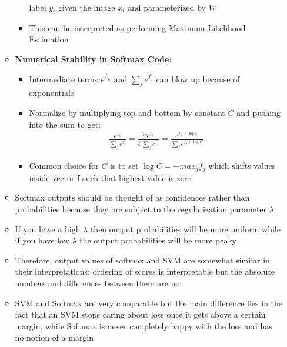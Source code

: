 \documentclass[12pt]{article}
\begin{document}
\begin{itemize}
\begin{itemize}
\begin{itemize}
        label $y_i$ given the image $x_i$ and parameterized by $W$
        \item This can be interpreted as performing Maximum-Likelihood Estimation
      \end{itemize}
      \item \textbf{Numerical Stability in Softmax Code}:
      \begin{itemize}
        \item Intermediate terms $e^{f_{y_i}}$ and $\sum_j e^{f_j}$ can blow up because of exponentials
        \item Normalize by multiplying top and bottom by constant $C$ and pushing into the sum to get:
        \begin{gather*}
          \frac{e^{f_{y_i}}}{\sum_j e^{f_j}} 
          = \frac{Ce^{f_{y_i}}}{C\sum_j e^{f_j}} 
          = \frac{e^{f_{y_i}+\log{C}}}{\sum_j e^{f_j + \log{C}}}
        \end{gather*}
        \item Common choice for $C$ is to set $\log{C} = -max_jf_j$ which shifts values inside vector f
        such that highest value is zero
      \end{itemize}
      \item Softmax outputs should be thought of as confidences rather than probabilities because they are subject
      to the regularization parameter $\lambda$
      \item If you have a high $\lambda$ then output probabilities will be more uniform while if you have low $\lambda$
      the output probabilities will be more peaky
      \item Therefore, output values of softmax and SVM are somewhat similar in their interpretations: ordering of scores is
      interpretable but the absolute numbers and differences between them are not
      \item SVM and Softmax are very comparable but the main difference lies in the fact that an SVM stops caring about loss once
      it gets above a certain margin, while Softmax is never completely happy with the loss and has no notion of a margin
    \end{itemize}
  \end{itemize}
\end{document}
